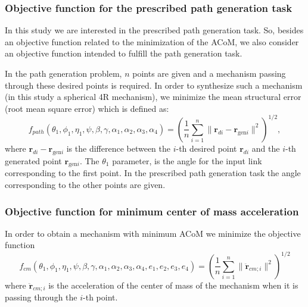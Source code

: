 \documentclass[11pt]{article}
\providecommand{\norm}[1]{\lVert #1\rVert }
\begin{document}
\subsubsection{Objective function for the prescribed path generation 
task}
In this study we are interested in the prescribed path generation task. 
So, besides an objective function related to the minimization of the 
ACoM, we also consider an objective function intended to fulfill the 
path generation task.

In the path generation problem,  $n$ points are given and a mechanism 
passing through these desired points is required. In order to synthesize 
such a mechanism (in this study a spherical 4R mechanism), we minimize 
the mean structural error (root mean square error) which  is defined as:
\begin{equation}\label{objectivef}
f_{path}(\theta_1,\phi_1,\eta_1,\psi,\beta,\gamma,\alpha_1,\alpha_2,
\alpha_3,\alpha_4)=\left(\frac{1}{n}\sum_{i=1}^n \norm{{\mathbf r}_{di}-
{\mathbf r}_{\text{gen}i}}^2\right)^{1/2},
\end{equation}
where ${\mathbf r}_{di}-{\mathbf r}_{\text{gen}i}$ is the difference 
between the $i$-th desired point ${\mathbf r}_{di}$ and   the $i$-th 
generated point ${\mathbf r}_{\text{gen}i}$.
The $\theta_1$ parameter, is the angle  for the input link corresponding 
to the first point. In the prescribed path generation task the angle 
corresponding to the other points are given. 

\subsubsection{Objective function for minimum center of  mass 
acceleration}
In order to obtain a mechanism with minimum ACoM we minimize 
the objective function
  \begin{equation}\label{fcm}
  f_{cm}(\theta_1,\phi_1,\eta_1,\psi,\beta,\gamma,\alpha_1,\alpha_2,
  \alpha_3,\alpha_4,e_1,e_2,e_3,e_4)=\left(\frac{1}{n}\sum_{i=1}^n 
  \norm{\mathbf{\ddot{r}}_{cm;i}}^2\right)^{1/2}
  \end{equation}
  where $\mathbf{\ddot{r}}_{cm;i}$ is the acceleration of the center of 
  mass of the mechanism when it is passing through the $i$-th point. 
\end{document}

